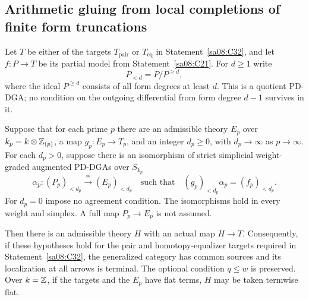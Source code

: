 \subsection{Arithmetic gluing from local completions of finite form truncations}

\begin{theorem}
\label{sa08:C34}
Let $T$ be either of the targets $T_{\mathrm{pair}}$ or
$T_{\mathrm{eq}}$ in Statement~\ref{sa08:C32}, and let
$f:P\to T$ be its partial model from Statement~\ref{sa08:C21}.
For $d\geq1$ write
\[
 P_{<d}=P/P^{\geq d},
\]
where the ideal $P^{\geq d}$ consists of all form degrees at
least $d$. This is a quotient PD-DGA; no condition on the
outgoing differential from form degree $d-1$ survives in it.

Suppose that for each prime $p$ there are an admissible theory
$E_p$ over $k_p=k\otimes\mathbb Z_{(p)}$, a map $g_p:E_p\to T_p$,
and an integer $d_p\geq0$, with $d_p\to\infty$ as $p\to\infty$.
For each $d_p>0$, suppose there is an isomorphism of strict
simplicial weight-graded augmented PD-DGAs over $S_{k_p}$
\[
 \alpha_p:(P_p)_{<d_p}\xrightarrow{\ \cong\ }(E_p)_{<d_p}
 \quad\text{such that}\quad
 (g_p)_{<d_p}\alpha_p=(f_p)_{<d_p}.
\]
For $d_p=0$ impose no agreement condition. The isomorphisms
hold in every weight and simplex. A full map $P_p\to E_p$
is not assumed.

Then there is an admissible theory $H$ with an actual map
$H\to T$. Consequently, if these hypotheses hold for the
pair and homotopy-equalizer targets required in
Statement~\ref{sa08:C32}, the generalized category has common
sources and its localization at all arrows is terminal.
The optional condition $q\leq w$ is preserved. Over $k=\mathbb Z$,
if the targets and the $E_p$ have flat terms, $H$ may be
taken termwise flat.
\end{theorem}
